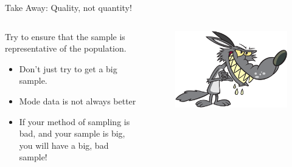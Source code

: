 \documentclass[aspectratio=169]{../latex_main/tntbeamer}  %
\begin{document}
	\begin{frame}{Take Away: Quality, not quantity!}
	     \begin{columns}
	        \begin{column}{.4\textwidth}
         
	            Try to ensure that the sample is representative of the population.
                   \begin{itemize}
                       \item Don’t just try to get a big sample.
                       \item Mode data is not always better
                       \item If your method of sampling is bad, and your sample is big, you will have a big, bad sample!
                   \end{itemize}
                   \bigskip

	        \end{column}
	        \begin{column}{.4\textwidth}
	               \begin{figure}
	                   \centering
	                   \includegraphics[scale=.4]{Bild10}
	               \end{figure}
	        \end{column}
	        
	    \end{columns}
	\end{frame}
	
\end{document}
